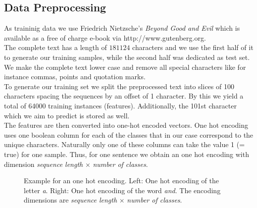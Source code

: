 \documentclass[11pt,a4paper,bibliography=totocnumbered,listof=totocnumbered]{scrartcl}
\begin{document}
\subsection{Data Preprocessing}
As traininig data we use Friedrich Nietzsche’s \textit{Beyond Good and Evil} which is available as a free of charge e-book via http://www.gutenberg.org. \\
The complete text has a length of $181124$ characters and we use the first half of it to generate our training samples, while the second half was dedicated as test set. We make the complete text lower case and remove all special characters like for instance commas, points and quotation marks. \\
To generate our training set we split the preprocessed text into slices of 100 characters spacing the sequences by an offset of 1 character. By this we yield a total of 64000 training instances (features). Additionally, the 101st character which we aim to predict is stored as well. \\
The features are then converted into one-hot encoded vectors. One hot encoding uses one boolean column for each of the classes that in our case correspond to the unique characters. Naturally only one of these columns can take the value 1 (= true) for one sample. Thus, for one sentence we obtain an one hot encoding with dimension \textit{sequence length} $\times$ \textit{number of classes}.

	\begin{figure}[h!] 
		\label{fig:onehot}
		\caption{Example for an one hot encoding. Left: One hot encoding of the letter \textit{a}. Right: One hot encoding of the word \textit{and}. The encoding dimensions are \textit{sequence length} $\times$ \textit{number of classes}.}
	\end{figure}
\end{document}
